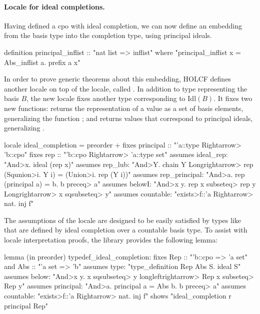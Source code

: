 \paragraph{Locale for ideal completions.} Having defined a cpo with ideal completion, we can now define an embedding from the basis type into the completion type, using principal ideals.
%
\begin{isacode}
definition principal_inflist :: "nat list => inflist"
  where "principal_inflist x = Abs_inflist {a. prefix a x}"
\end{isacode}
%
In order to prove generic theorems about this embedding, HOLCF defines another locale on top of the  locale, called . In addition to type  representing the basis $B$, the new locale fixes another type  corresponding to $\mathrm{Idl}(B)$. It fixes two new functions:  returns the representation of a value as a set of basis elements, generalizing the function ; and  returns values that correspond to principal ideals, generalizing .
%
\begin{isacode}
locale ideal_completion = preorder +
  fixes principal :: "'a::type \<Rightarrow> 'b::cpo"
  fixes rep :: "'b::cpo \<Rightarrow> 'a::type set"
  assumes ideal_rep: "\<And>x. ideal (rep x)"
  assumes rep_lub: "\<And>Y. chain Y \<Longrightarrow> rep (\<Squnion>i. Y i) = (\<Union>i. rep (Y i))"
  assumes rep_principal: "\<And>a. rep (principal a) = {b. b \<preceq> a}"
  assumes belowI: "\<And>x y. rep x \<subseteq> rep y \<Longrightarrow> x \<sqsubseteq> y"
  assumes countable: "\<exists>f::'a \<Rightarrow> nat. inj f"
\end{isacode}
%
The assumptions of the  locale are designed to be easily satisfied by types like  that are defined by ideal completion over a countable basis type. To assist with  locale interpretation proofs, the library provides the following lemma:
%
\begin{isacode}
lemma (in preorder) typedef_ideal_completion:
  fixes Rep :: "'b::cpo => 'a set" and Abs :: "'a set => 'b"
  assumes type: "type_definition Rep Abs {S. ideal S}"
  assumes below: "\<And>x y. x \<sqsubseteq> y \<longleftrightarrow> Rep x \<subseteq> Rep y"
  assumes principal: "\<And>a. principal a = Abs {b. b \<preceq> a}"
  assumes countable: "\<exists>f::'a \<Rightarrow> nat. inj f"
  shows "ideal_completion r principal Rep"
\end{isacode}
